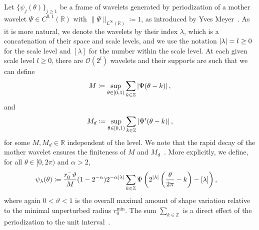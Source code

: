 Let $\{\psi_j(\theta)\}_{j\geq 1}$ be a frame of wavelets generated by periodization of a mother wavelet $\Psi \in C^{0, 1}(\mathbb{R})$ with $\|\Psi\|_{L^\infty(\mathbb{R})}\coloneqq1$, as introduced by Yves Meyer~\cite{meyer1994}.
As it is more natural, we denote the wavelets by their index $\lambda$, which is a concatenation of their space and scale levels, and we use the notation $\left|\lambda\right|=l\geq 0$ for the scale level and $[\lambda]$ for the number within the scale level.
At each given scale level $l \geq 0$, there are $\mathcal{O}(2^{l})$ wavelets and their supports are such that we can define
\begin{equation}
    M\coloneqq\sup_{\theta \in [0,1)} \sum_{k \in \mathbb{Z}}\left|\Psi(\theta - k)\right|, \label{eq:Mbound}
\end{equation}
and
\begin{equation}
    M_d\coloneqq\sup_{\theta \in [0,1)} \sum_{k \in \mathbb{Z}}\left|\Psi'(\theta - k)\right|, \label{eq:Mbound3}
\end{equation}
for some $M, M_d \in \mathbb{R}$ independent of the level.
We note that the rapid decay of the mother wavelet ensures the finiteness of $M$ and $M_d$~\cite{meyer1994}.
More explicitly, we define, for all $\theta\in[0, 2\pi)$ and $\alpha>2$,
\begin{align}
    \psi_\lambda(\theta)&\coloneqq \frac{r_0^-\vartheta}{M}(1-2^{-\alpha}) 2^{-\alpha \left|\lambda\right|} \sum_{k\in\mathbb{Z}}\Psi\left(2^{|\lambda|}\left(\frac{\theta}{2\pi}-k\right)-[\lambda]\right), \label{eq:waveletdef}
\end{align}
where again $0 < \vartheta < 1 $ is the overall maximal amount of shape variation relative to the minimal unperturbed radius $r_0^{\min}$.
The sum $\sum_{k\in\mathbb{Z}}$ is a direct effect of the periodization to the unit interval~\cite{meyer1992}.

